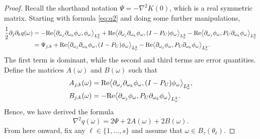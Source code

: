 \documentclass[11pt]{article}
\theoremstyle{definition}
\numberwithin{theorem}{section}
\numberwithin{lemma}{section}
\numberwithin{equation}{section}
\renewcommand{\Re}{{\rm Re}}
\newcommand{\inner}[1]{{\left\langle#1\right\rangle}}
\numberwithin{equation}{section}
\begin{document}
	\begin{proof}
	Recall the shorthand notation $\Psi=-\nabla^2 K(0)$, which is a real symmetric matrix. Starting with formula \eqref{eq:q2} and doing some  further manipulations,
	\begin{equation*}
		\begin{split}
			\frac 12 \partial_j \partial_k q(\omega)
			&=-\Re \inner{\partial_{\omega_j} \partial_{\omega_k} \phi_\omega, \phi_\omega}_{L^2_\nu} + \Re \inner{\partial_{\omega_j} \partial_{\omega_k} \phi_\omega, (I-P_U) \phi_\omega}_{L^2_\nu} -\Re \inner{\partial_{\omega_j} \phi_\omega, P_U \partial_{\omega_k} \phi_\omega}_{L^2_\nu} \\ 
			&=\Psi_{j,k} + \Re \inner{\partial_{\omega_j} \partial_{\omega_k} \phi_\omega, (I-P_U) \phi_\omega}_{L^2_\nu} - \Re \inner{\partial_{\omega_j} \phi_\omega, P_U \partial_{\omega_k}\phi_\omega}_{L^2_\nu}.
		\end{split}
	\end{equation*}
	The first term is dominant, while the second and third terms are error quantities. Define the matrices $A(\omega)$ and $B(\omega)$ such that 
	\begin{align*}
		A_{j,k}(\omega)
		&=\Re \inner{\partial_{\omega_j} \partial_{\omega_k} \phi_\omega, (I-P_U) \phi_\omega}_{L^2_\nu} , \\
		B_{j,k}(\omega)
		&=- \Re \inner{\partial_{\omega_j} \phi_\omega, P_U \partial_{\omega_k}\phi_\omega}_{L^2_\nu}. 
	\end{align*}
	Hence, we have derived the formula
	\begin{equation}\label{eq:hessianq}
		\nabla^2 q (\omega) 
		= 2\Psi + 2A(\omega) + 2B(\omega). 
	\end{equation}		
	From here onward, fix any $\ell\in \{1,\dots,s\}$ and assume that $\omega\in B_\tau(\theta_\ell)$. 
	

\end{proof}
\end{document}
